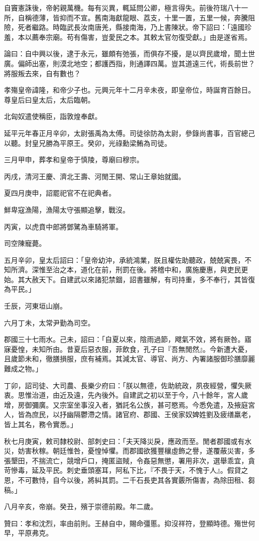 \begin{pinyinscope}
自竇憲誅後，帝躬親萬機。每有災異，輒延問公卿，極言得失。前後符瑞八十一所，自稱德薄，皆抑而不宣。舊南海獻龍眼、荔支，十里一置，五里一候，奔騰阻險，死者繼路。時臨武長汝南唐羌，縣接南海，乃上書陳狀。帝下詔曰：「遠國珍羞，本以薦奉宗廟。苟有傷害，豈愛民之本。其敕太官勿復受獻。」由是遂省焉。

論曰：自中興以後，逮于永元，雖頗有弛張，而俱存不擾，是以齊民歲增，聞土世廣。偏師出塞，則漠北地空；都護西指，則通譯四萬。豈其道遠三代，術長前世？將服叛去來，自有數也？

孝殤皇帝諱隆，和帝少子也。元興元年十二月辛未夜，即皇帝位，時誕育百餘日。尊皇后曰皇太后，太后臨朝。

北匈奴遣使稱臣，詣敦煌奉獻。

延平元年春正月辛卯，太尉張禹為太傅。司徒徐防為太尉，參錄尚書事，百官總己以聽。封皇兄勝為平原王。癸卯，光祿勳梁鮪為司徒。

三月甲申，葬孝和皇帝于慎陵，尊廟曰穆宗。

丙戌，清河王慶、濟北王壽、河閒王開、常山王章始就國。

夏四月庚申，詔罷祀官不在祀典者。

鮮卑寇漁陽，漁陽太守張顯追擊，戰沒。

丙寅，以虎賁中郎將鄧騭為車騎將軍。

司空陳寵薨。

五月辛卯，皇太后詔曰：「皇帝幼沖，承統鴻業，朕且權佐助聽政，兢兢寅畏，不知所濟。深惟至治之本，道化在前，刑罰在後。將稽中和，廣施慶惠，與吏民更始。其大赦天下。自建武以來諸犯禁錮，詔書雖解，有司持重，多不奉行，其皆復為平民。」

壬辰，河東垣山崩。

六月丁未，太常尹勤為司空。

郡國三十七雨水。己未，詔曰：「自夏以來，陰雨過節，飕氣不效，將有厥咎。寤寐憂惶，未知所由。昔夏后惡衣服，菲飲食，孔子曰『吾無閒然』。今新遭大憂，且歲節未和，徹膳損服，庶有補焉。其減太官、導官、尚方、內署諸服御珍膳靡麗難成之物。」

丁卯，詔司徒、大司農、長樂少府曰：「朕以無德，佐助統政，夙夜經營，懼失厥衷。思惟治道，由近及遠，先內後外。自建武之初以至于今，八十餘年，宮人歲增，房御彌廣。又宗室坐事沒入者，猶託名公族，甚可愍焉。今悉免遣，及掖庭宮人，皆為庶民，以抒幽隔鬱滯之情。諸官府、郡國、王侯家奴婢姓劉及疲缮羸老，皆上其名，務令實悉。」

秋七月庚寅，敕司隸校尉、部刺史曰：「夫天降災戾，應政而至。閒者郡國或有水災，妨害秋稼。朝廷惟咎，憂惶悼懼。而郡國欲獲豐穰虛飾之譽，遂覆蔽災害，多張墾田，不揣流亡，競增戶口，掩匿盜賊，令姦惡無懲，署用非次，選舉乖宜，貪苛慘毒，延及平民。刺史垂頭塞耳，阿私下比，『不畏于天，不愧于人』。假貸之恩，不可數恃，自今以後，將糾其罰。二千石長吏其各實覈所傷害，為除田租、芻稿。」

八月辛亥，帝崩。癸丑，殯于崇德前殿。年二歲。

贊曰：孝和沈烈，率由前則。王赫自中，賜命彊慝。抑沒祥符，登顯時德。殤世何早，平原弗克。


\end{pinyinscope}